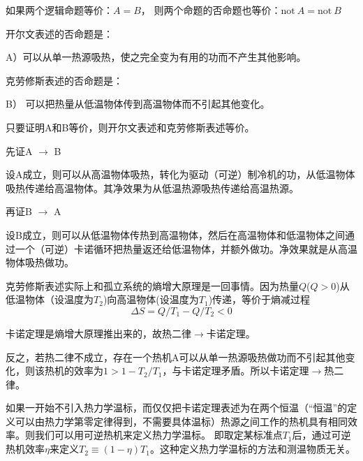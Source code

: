 \documentclass[CJK]{beamer}
\begin{document}
\begin{frame}
\bch
如果两个逻辑命题等价：$A=B$， 则两个命题的否命题也等价：$\mathrm{not}\ A = \mathrm{not}\ B$
\ech
\end{frame}

\begin{frame}
\bch
{\small
\bitem
\item{
开尔文表述的否命题是：

A）可以从单一热源吸热，使之完全变为有用的功而不产生其他影响。
}
\item{
克劳修斯表述的否命题是：

B） 可以把热量从低温物体传到高温物体而不引起其他变化。
}
\eitem

只要证明A和B等价，则开尔文表述和克劳修斯表述等价。

先证A $\rightarrow$ B

设A成立，则可以从高温物体吸热，转化为驱动（可逆）制冷机的功，从低温物体吸热传递给高温物体。其净效果为从低温热源吸热传递给高温热源。

\skipline

再证B $\rightarrow$ A

设B成立，则可以从低温物体传热到高温物体，然后在高温物体和低温物体之间通过一个（可逆）卡诺循环把热量返还给低温物体，并额外做功。净效果就是从高温物体吸热做功。
}
\ech
\end{frame}

\begin{frame}
\bch
克劳修斯表述实际上和孤立系统的熵增大原理是一回事情。因为热量$Q$($Q>0$)从低温物体（设温度为$T_2$)向高温物体(设温度为$T_1$)传递，等价于熵减过程
$$\Delta S = Q/T_1 - Q/T_2<0$$
\ech
\end{frame}

\begin{frame}
\bch
卡诺定理是熵增大原理推出来的，故热二律$\rightarrow$卡诺定理。

反之，若热二律不成立，存在一个热机A可以从单一热源吸热做功而不引起其他变化，则该热机的效率为$1>1-T_2/T_1$，与卡诺定理矛盾。所以卡诺定理$\rightarrow$热二律。

\ech
\end{frame}

\begin{frame}
\bch
如果一开始不引入热力学温标，而仅仅把卡诺定理表述为在两个恒温（“恒温”的定义可以由热力学第零定律得到，不需要具体温标）热源之间工作的热机具有相同效率。则我们可以用可逆热机来定义热力学温标。
即取定某标准点$T_1$后，通过可逆热机效率$\eta$来定义$T_2 \equiv (1-\eta)T_1$。这种定义热力学温标的方法和测温物质无关。
\ech
\end{frame}
\end{document}
